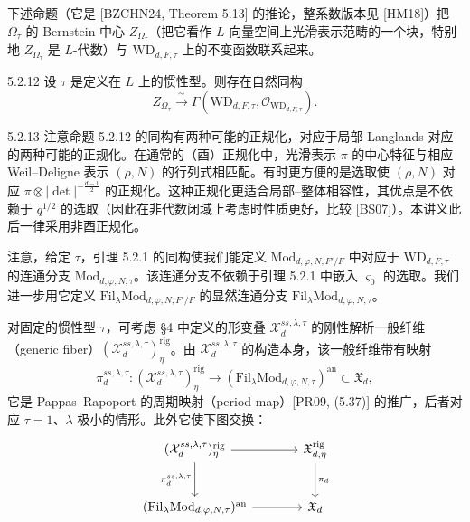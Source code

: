 下述命题（它是 [BZCHN24, Theorem 5.13] 的推论，整系数版本见 [HM18]）把 $\Omega_\tau$ 的 Bernstein 中心 $Z_{\Omega_\tau}$（把它看作 $L$-向量空间上光滑表示范畴的一个块，特别地 $Z_{\Omega_\tau}$ 是 $L$-代数）与 $\mathrm{WD}_{d,F,\tau}$ 上的不变函数联系起来。

\begin{prop}{5.2.12}
设 $\tau$ 是定义在 $L$ 上的惯性型。则存在自然同构
\[
Z_{\Omega_\tau}\xrightarrow{\ \sim\ }\Gamma(\mathrm{WD}_{d,F,\tau},\mathcal{O}_{\mathrm{WD}_{d,F,\tau}}).
\]
\label{thm:a4-5-2-12}
\end{prop}

\begin{rem}{5.2.13}
注意命题 5.2.12 的同构有两种可能的正规化，对应于局部 Langlands 对应的两种可能的正规化。在通常的（酉）正规化中，光滑表示 $\pi$ 的中心特征与相应 Weil--Deligne 表示 $(\rho,N)$ 的行列式相匹配。有时更方便的是选取使 $(\rho,N)$ 对应 $\pi\otimes|\det|^{-\frac{d-1}{2}}$ 的正规化。这种正规化更适合局部–整体相容性，其优点是不依赖于 $q^{1/2}$ 的选取（因此在非代数闭域上考虑时性质更好，比较 [BS07]）。本讲义此后一律采用非酉正规化。
\label{thm:a4-5-2-13}
\end{rem}

注意，给定 $\tau$，引理 5.2.1 的同构使我们能定义 $\mathrm{Mod}_{d,\varphi,N,F'/F}$ 中对应于 $\mathrm{WD}_{d,F,\tau}$ 的连通分支 $\mathrm{Mod}_{d,\varphi,N,\tau}$。该连通分支不依赖于引理 5.2.1 中嵌入 $\varsigma_0$ 的选取。我们进一步用它定义 $\mathrm{Fil}_\lambda\mathrm{Mod}_{d,\varphi,N,F'/F}$ 的显然连通分支 $\mathrm{Fil}_\lambda\mathrm{Mod}_{d,\varphi,N,\tau}$。

对固定的惯性型 $\tau$，可考虑 §4 中定义的形变叠 $\mathcal{X}^{ss,\lambda,\tau}_d$ 的刚性解析一般纤维（generic fiber）$(\mathcal{X}^{ss,\lambda,\tau}_d)^{\mathrm{rig}}_\eta$。由 $\mathcal{X}^{ss,\lambda,\tau}_d$ 的构造本身，该一般纤维带有映射
\begin{equation}\tag{5.2.14}
\pi^{ss,\lambda,\tau}_d: (\mathcal{X}^{ss,\lambda,\tau}_d)^{\mathrm{rig}}_\eta\longrightarrow(\mathrm{Fil}_\lambda\mathrm{Mod}_{d,\varphi,N,\tau})^{\mathrm{an}}\subset\mathfrak{X}_d,
\end{equation}
它是 Pappas--Rapoport 的周期映射（period map）[PR09, (5.37)] 的推广，后者对应 $\tau=1$、$\lambda$ 极小的情形。此外它使下图交换：
\[
\begin{tikzcd}[column sep=large,row sep=large]
(\mathcal{X}^{ss,\lambda,\tau}_d)^{\mathrm{rig}}_\eta \arrow[r] \arrow[d,"\pi^{ss,\lambda,\tau}_d"']
& \mathfrak{X}^{\mathrm{rig}}_{d,\eta} \arrow[d,"\pi_d"]\\
(\mathrm{Fil}_\lambda\mathrm{Mod}_{d,\varphi,N,\tau})^{\mathrm{an}} \arrow[r]
& \mathfrak{X}_d
\end{tikzcd}
\]

